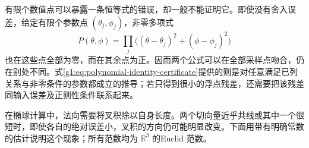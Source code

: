 \ProseParagraphBreak

有限个数值点可以暴露一条恒等式的错误，却一般不能证明它。即使没有舍入误差，给定有限个参数点 \((\theta_j,\phi_j)\)，非零多项式
\[
	P(\theta,\phi)=\prod_j\bigl((\theta-\theta_j)^2+(\phi-\phi_j)^2\bigr)
\]
也在这些点全部为零，而在其余点为正。因而两个公式可以在全部采样点吻合，仍在别处不同。式\eqref{g1:eq:polynomial-identity-certificate}提供的则是对任意满足已列关系与非零条件的参数都成立的推导；若只得到很小的浮点残差，还需要把该残差同输入误差及正则性条件联系起来。

\ProseParagraphBreak

在椭球计算中，法向需要将叉积除以自身长度。两个切向量近乎共线或其中一个很短时，即使各自的绝对误差小，叉积的方向仍可能明显改变。下面用带有明确常数的估计说明这个现象；所有范数均为 \(\mathbb R^3\) 的Euclid 范数。


